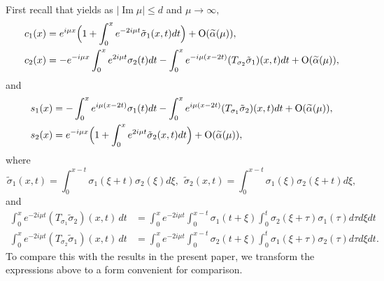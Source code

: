 \documentclass[11pt]{amsart}
\theoremstyle{plain}
\theoremstyle{definition}
\theoremstyle{remark}
\numberwithin{equation}{section}
\renewcommand\Im{\operatorname{Im}}
\begin{document}
First recall that \cite[Lemma 2.2]{Rzep21} yields
as $|\Im \mu| \leq d$ and $\mu \to \infty,$
\begin{align*}
c_1(x)&=e^{i\mu x}\Big(1+\int_0^xe^{-2i \mu t}\tilde{\sigma}_1(x,t)dt\Big)+{\rm O}(\widetilde{\alpha}(\mu)),\\
c_2(x)&= -e^{-i\mu x}\int_0^xe^{2i \mu t}\sigma_2(t) dt-\int_0^xe^{-i \mu( x-2t)}(T_{\sigma_2}\tilde{\sigma}_1)(x,t)dt+{\rm O}(\widetilde{\alpha}(\mu)),
\end{align*}
and
\begin{align*}
s_1(x)&= -\int_0^xe^{i \mu (x-2t)}\sigma_1(t) dt-\int_0^xe^{i \mu(x- 2t)}(T_{\sigma_1}\tilde{\sigma}_2)(x,t)dt+{\rm O}(\widetilde{\alpha}(\mu)),\\
s_2(x)&= e^{-i\mu x}\Big(1+\int_0^xe^{2i \mu t}\tilde{\sigma}_2(x,t)dt\Big)+{\rm O}(\widetilde{\alpha}(\mu)),
\end{align*}
where
$$\tilde{\sigma}_1(x,t)=\int_0^{x-t}\sigma_1(\xi+t)\sigma_2(\xi) d \xi, \ \ \tilde{\sigma}_2(x,t)=\int_0^{x-t}\sigma_1(\xi)\sigma_2(\xi+t) d \xi,$$
and
\begin{align*}
\int_0^xe^{-2i\mu t}(T_{\sigma_1}\tilde{\sigma}_2)(x,t)\,dt&=\int_0^xe^{-2i\mu t} \int_0^{x-t} \sigma_1(t+\xi)\int_0^t\sigma_2(\xi+\tau)\sigma_1(\tau) d\tau d\xi dt\\
\int_0^xe^{-2i\mu t}(T_{\sigma_2}\tilde{\sigma}_1)(x,t)\,dt&=\int_0^xe^{-2i\mu t} \int_0^{x-t} \sigma_2(t+\xi)\int_0^t\sigma_1(\xi+\tau)\sigma_2(\tau) d\tau d\xi dt.
\end{align*}
To compare this with the results in the present paper,
we transform the expressions above to a form convenient for comparison.
\end{document}
